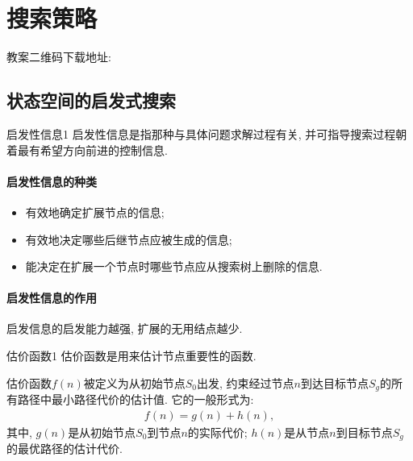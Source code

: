 \section{搜索策略}
教案二维码下载地址: 
\subsection{状态空间的启发式搜索}
\begin{mydef}{启发性信息}{1}
    启发性信息是指那种与具体问题求解过程有关, 并可指导搜索过程朝着最有希望方向前进的控制信息.
\end{mydef}
\paragraph{启发性信息的种类}
\begin{itemize}
\item 有效地确定扩展节点的信息;
\item 有效地决定哪些后继节点应被生成的信息;
\item 能决定在扩展一个节点时哪些节点应从搜索树上删除的信息.
\end{itemize}
\paragraph{启发性信息的作用} 启发信息的启发能力越强, 扩展的无用结点越少.

\begin{mydef}{估价函数}{1}
    估价函数是用来估计节点重要性的函数.
\end{mydef}
估价函数$f(n)$被定义为从初始节点$S_0$出发, 约束经过节点$n$到达目标节点$S_g$的所有路径中最小路径代价的估计值. 它的一般形式为:
\begin{align}
    f(n)=g(n)+h(n),
\end{align}
其中, $g(n)$是从初始节点$S_0$到节点$n$的实际代价; $h(n)$是从节点$n$到目标节点$S_g$的最优路径的估计代价.
